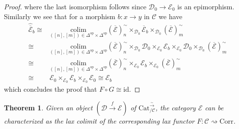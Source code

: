 \documentclass[a4paper, reqno]{amsart}
\newtheorem{theorem}{Theorem}[section]
\theoremstyle{definition}
\newcommand\cC{\mathscr C}
\newcommand\cD{\mathscr D}
\newcommand\cE{\mathscr E}
\newcommand\id{\mathrm{id}}
\newcommand\op{\mathrm{op}}
\newcommand\cat{\mathrm{Cat}}
\newcommand\colim{\mathrm{colim}}
\newcommand\corr{\mathrm{Corr}}
\newcommand\wrr{{\overset{\sim}{\rightarrow}}}
\begin{document}
\begin{proof}
where the last isomorphism follows since $\cD_0\rightarrow\cE_0$ is an epimorphism. Similarly we see that for a morphism $b:x\rightarrow y$ in $\cC$ we have
\begin{align*}
        \widehat{\overline{\cE}}_b\cong&\underset{([n],[m])\in\Delta^\op\times\Delta^\op}{\colim}(\overline{\cE})^\sim_n\times_{\cD_0}\overline{\cE}_b\times_{\cD_0} (\overline{\cE})^\sim_m\\
        \cong&\underset{([n],[m])\in\Delta^\op\times\Delta^\op}{\colim}(\overline{\cE})^\sim_n\times_{\cD_0}\cD_0\times_{\cE_0}\cE_b\times_{\cE_0}\cD_0\times_{\cD_0}(\overline{\cE})^\sim_m\\
        \cong&\underset{([n],[m])\in\Delta^\op\times\Delta^\op}{\colim}(\overline{\cE})^\sim_n\times_{\cE_0}\cE_b\times_{\cE_0}(\overline{\cE})^\sim_m\\
        \cong& \cE_0\times_{\cE_0}\cE_b\times_{\cE_0}\cE_0\cong\cE_b
\end{align*}
which concludes the proof that $F\circ G\cong \id$.
\end{proof}
\begin{theorem}\label{thm:lax_colim}
Given an object $(\cD\xrightarrow{f}\cE)$ of $\cat^{\wrr}_{/\cC}$, the category $\cE$ can be characterized as the lax colimit of the corresponding lax functor $F:\cC\rightsquigarrow\corr$.
\end{theorem}
\end{document}
